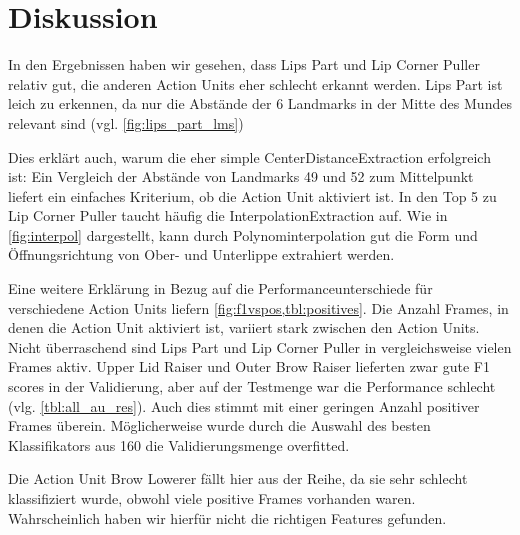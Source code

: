 \chapter{Diskussion}\label{ch:diskussion}

In den Ergebnissen haben wir gesehen, dass Lips Part und Lip Corner Puller
relativ gut, die anderen Action Units eher schlecht erkannt werden. Lips Part
ist leich zu erkennen, da nur die Abstände der 6 Landmarks in der Mitte des
Mundes relevant sind (vgl. \cref{fig:lips_part_lms})

Dies erklärt auch, warum die eher simple CenterDistanceExtraction erfolgreich
ist: Ein Vergleich der Abstände von Landmarks 49 und 52 zum Mittelpunkt liefert
ein einfaches Kriterium, ob die Action Unit aktiviert ist.
In den Top 5 zu Lip Corner Puller taucht häufig die InterpolationExtraction auf.
Wie in \cref{fig:interpol} dargestellt, kann durch Polynominterpolation gut die
Form und Öffnungsrichtung von Ober- und Unterlippe extrahiert werden. 

Eine weitere Erklärung in Bezug auf die Performanceunterschiede für verschiedene
Action Units liefern \cref{fig:f1vspos,tbl:positives}. Die Anzahl Frames, in
denen die Action Unit aktiviert ist, variiert stark zwischen den Action Units.
Nicht überraschend sind Lips Part und Lip Corner Puller in vergleichsweise
vielen Frames aktiv. Upper Lid Raiser und Outer Brow Raiser lieferten
zwar gute F1 scores in der Validierung, aber auf der Testmenge war die
Performance schlecht (vlg. \cref{tbl:all_au_res}). Auch dies stimmt mit einer
geringen Anzahl positiver Frames überein. Möglicherweise wurde durch die Auswahl
des besten Klassifikators aus 160 die Validierungsmenge overfitted.

Die Action Unit Brow Lowerer fällt hier aus der Reihe, da sie sehr schlecht
klassifiziert wurde, obwohl viele positive Frames vorhanden waren.
Wahrscheinlich haben wir hierfür nicht die richtigen Features gefunden.



